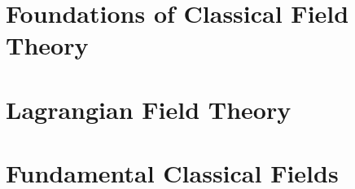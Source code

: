\documentclass[11pt,a4paper]{report}
\begin{document}
\hypersetup{pageanchor=false}

\clearpage
\hypersetup{pageanchor=true}
\setcounter{tocdepth}{1}
\tableofcontents

\clearpage
{}



\part{Foundations of Classical Field Theory}




\part{Lagrangian Field Theory}




\part{Fundamental Classical Fields}






\appendix








\clearpage
\listoffigures
\end{document}
